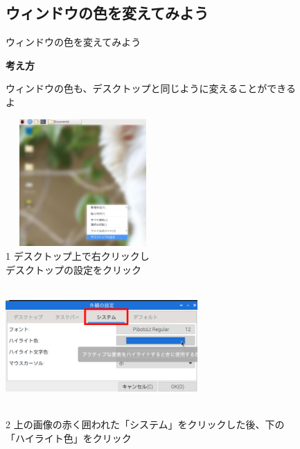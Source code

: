 \documentclass[a4paper,12pt]{jarticle}
\begin{document}
\bigskip

\clearpage

\begin{figure}
  \subsection{\theExercise ウィンドウの色を変えてみよう}
  ウィンドウの色を変えてみよう

  \textbf{考え方}


  \bigskip



  \centering
  \begin{minipage}{\textwidth}
    \begin{minipage}{7.737cm}
      ウィンドウの色も、デスクトップと同じように変えることができるよ
      \begin{minipage}{7.739cm}
        \includegraphics[width=5.892cm,height=4.864cm]{textbook-img107.png}\\
        1 デスクトップ上で右クリックし\\
        デスクトップの設定をクリック
      \end{minipage}
    \end{minipage}
    \begin{minipage}{2.582cm}
    \end{minipage}
    \begin{minipage}{7.737cm}
      \includegraphics[width=7.324cm,height=4.539cm]{textbook-img1001.png}\\
      \begin{minipage}{8.035cm}
        2 上の画像の赤く囲われた「システム」をクリックした後、下の「ハイライト色」をクリック
      \end{minipage}
    \end{minipage}


\end{minipage}
\end{figure}
\end{document}
